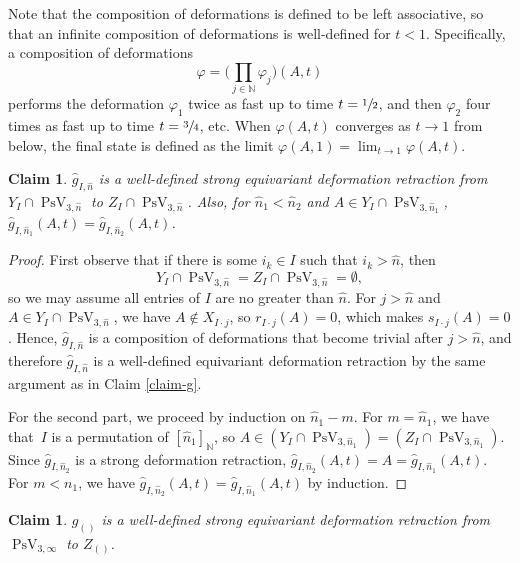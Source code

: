 \documentclass[11pt]{article}
\numberwithin{equation}{section}
\let\nicefrac\sfrac
\newtheorem{claim}[theorem]{Claim}
\theoremstyle{remark}
\let\mb\mathbb
\let\phi\varphi
\DeclareMathOperator{\pstief}{PsV}
\begin{document}
Note that the composition of deformations is defined to be left associative, so that an infinite composition of deformations is well-defined for $t<1$. Specifically, a composition of deformations
\[\phi = \biggl(\prod_{j \in \mb{N}} \phi_j\biggr) (A,t) \]
performs the deformation $\phi_1$ twice as fast up to time $t = \nicefrac{1}{2}$, and then $\phi_2$ four times as fast up to time $t = \nicefrac{3}{4}$, etc.
When $\phi(A,t)$ converges as $t \to 1$ from below, the final state is defined as the limit $\phi(A,1) = \lim_{t \to 1} \phi(A,t)$.

\begin{claim}\label{claim-consistent-g}
$\hat g_{I,\hat n}$ is a well-defined strong equivariant deformation retraction from $Y_I \cap \pstief_{3,\hat n}$ to $Z_I \cap \pstief_{3,\hat n}$.
Also, for $\hat n_1 < \hat n_2$ and $A \in Y_I \cap \pstief_{3,\hat n_1}$, $\hat g_{I,\hat n_1}(A,t) = \hat g_{I,\hat n_2}(A,t)$.
\end{claim}

\begin{proof}
First observe that if there is some $i_k \in I$ such that $i_k > \hat n$, then
\[
Y_I \cap \pstief_{3,\hat n} = Z_I \cap \pstief_{3,\hat n} = \emptyset,
\]
so we may assume all entries of $I$ are no greater than $\hat n$.
For $j > \hat n$ and \hbox{$A \in Y_I \cap \pstief_{3,\hat n}$}, we have $A \not \in X_{I\cdot j}$, so $r_{I\cdot j}(A) = 0$, which makes $s_{I\cdot j}(A) = 0$. Hence, $\hat g_{I,\hat n}$ is a composition of deformations that become trivial after $j > \hat n$, and therefore $\hat g_{I,\hat n}$ is a well-defined equivariant deformation retraction by the same argument as in Claim \ref{claim-g}.

For the second part, we proceed by induction on $\hat n_1 -m$.
For $m = \hat n_1$, we have that~$I$ is a permutation of $[\hat n_1]_\mb{N}$, so $A \in (Y_I \cap \pstief_{3,\hat n_1}) = (Z_I \cap \pstief_{3,\hat n_1})$. Since $\hat g_{I,\hat n_2}$ is a strong deformation retraction, $\hat g_{I,\hat n_2}(A,t) = A = \hat g_{I,\hat n_1}(A,t)$. For $m < n_1$, we have $\hat g_{I,\hat n_2}(A,t) = \hat g_{I,\hat n_1}(A,t)$ by induction.
\end{proof}

\begin{claim}\label{claim-infinite-g}
$g_{()}$ is a well-defined strong equivariant deformation retraction from $\pstief_{3,\infty}$ to $Z_{()}$.
\end{claim}
\end{document}
